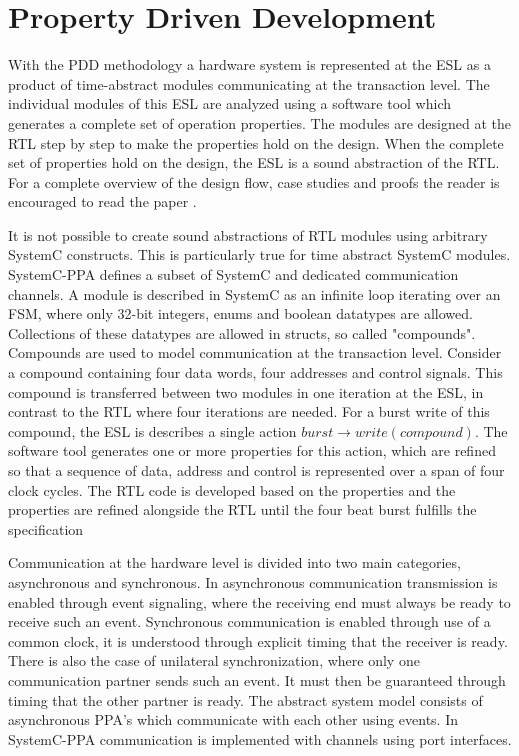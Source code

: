 \section{Property Driven Development}
\label{sec:pdd}
With the PDD methodology a hardware system is represented at the ESL as a product of time-abstract modules communicating at the transaction level. The individual modules of this ESL are analyzed using a software tool \cite{descam} which generates a complete set of operation properties. The modules are designed at the RTL step by step to make the properties hold on the design. When the complete set of properties hold on the design, the ESL is a sound abstraction of the RTL. For a complete overview of the design flow, case studies and proofs the reader is encouraged to read the paper \cite{pddref}. \par
It is not possible to create sound abstractions of RTL modules using arbitrary SystemC constructs. This is particularly true for time abstract SystemC modules. SystemC-PPA defines a subset of SystemC and dedicated communication channels. A module is described in SystemC as an infinite loop iterating over an FSM, where only 32-bit integers, enums and boolean datatypes are allowed. Collections of these datatypes are allowed in structs, so called "compounds". Compounds are used to model communication at the transaction level. Consider a compound containing four data words, four addresses and control signals. This compound is transferred between two modules in one iteration at the ESL, in contrast to the RTL where four iterations are needed. For a burst write of this compound, the ESL is describes a single action $burst\rightarrow write(compound)$. The software tool generates one or more properties for this action, which are refined so that a sequence of data, address and control is represented over a span of four clock cycles. The RTL code is developed based on the properties and the properties are refined alongside the RTL until the four beat burst fulfills the specification \par
Communication at the hardware level is divided into two main categories, asynchronous and synchronous. In asynchronous communication transmission is enabled through event signaling, where the receiving end must always be ready to receive such an event. Synchronous communication is enabled through use of a common clock, it is understood through explicit timing that the receiver is ready. There is also the case of unilateral synchronization, where only one communication partner sends such an event. It must then be guaranteed through timing that the other partner is ready. The abstract system model consists of asynchronous PPA's which communicate with each other using events. In SystemC-PPA communication is implemented with channels using port interfaces.



